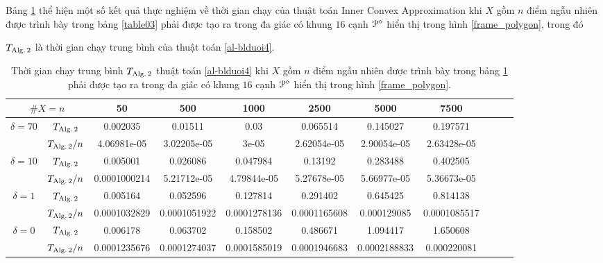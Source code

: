 \documentclass[12pt,a4paper,openany,oneside]{report}
\begin{document}
\medskip
Bảng \ref{table04}  thể hiện một số kết quả thực nghiệm về thời gian chạy của thuật toán Inner Convex Approximation khi $X$ gồm $n$ điểm ngẫu nhiên được trình bày trong bảng \ref{table03} phải được tạo ra trong đa giác có khung $16$ cạnh ${\cal P}^\diamond$ hiển thị trong hình \ref{frame_polygon}, trong đó

$T_{\rm Alg.\, 2}$ là thời gian chạy trung bình của thuật toán \ref{al-blduoi4}.

\begin{table}[ht]
	\begin{center}\renewcommand{\arraystretch}{1.2}\small
		\setlength\tabcolsep{0.05cm}
		\begin{tabular}{|c|c||c|c|c|c|c|c|c|c|c|}
			\hline
			\multicolumn {2}{|c||}{\footnotesize $\#X=n$} &50& 500& 1000& 2500& 5000& 7500\\ 
			\hline		
			\hline
			{ $\delta = 70$}
			
			& $T_{\rm Alg.\, 2}$  &0.002035 & 0.01511 & 0.03 & 0.065514 & 0.145027 & 0.197571 \\
			
			& $T_{\rm Alg.\, 2}/n$&4.06981e-05 & 3.02205e-05 & 3e-05 & 2.62054e-05 & 2.90054e-05 & 2.63428e-05 \\
			\hline
			{ $\delta = 10$}
			
			& $T_{\rm Alg.\, 2}$  &0.005001 & 0.026086 & 0.047984 & 0.13192 & 0.283488 & 0.402505 \\
			
			& $T_{\rm Alg.\, 2}/n$&0.0001000214 & 5.21712e-05 & 4.79844e-05 & 5.27678e-05 & 5.66977e-05 & 5.36673e-05 \\
			\hline
			{ $\delta = 1$}
			
			& $T_{\rm Alg.\, 2}$  &0.005164 & 0.052596 & 0.127814 & 0.291402 & 0.645425 & 0.814138\\
			
			& $T_{\rm Alg.\, 2}/n$&0.0001032829 & 0.0001051922 & 0.0001278136 & 0.0001165608 & 0.000129085 & 0.0001085517\\
			\hline
			{ $\delta = 0$}
			
			& $T_{\rm Alg.\, 2}$  &0.006178 & 0.063702 & 0.158502 & 0.486671 & 1.094417 & 1.650608 \\
			
			& $T_{\rm Alg.\, 2}/n$&0.0001235676 & 0.0001274037 & 0.0001585019 & 0.0001946683 & 0.0002188833 & 0.000220081\\
			\hline
		\end{tabular}
		\caption{Thời gian chạy trung bình $T_{\rm Alg.\,2}$  thuật toán \ref{al-blduoi4} khi $X$ gồm $n$ điểm ngẫu nhiên được trình bày trong bảng \ref{table04} phải được tạo ra trong đa giác có khung $16$ cạnh  ${\cal P}^\diamond$ hiển thị trong hình \ref{frame_polygon}.}
		\label{table04}
	\end{center}
\end{table} 	
\end{document}
